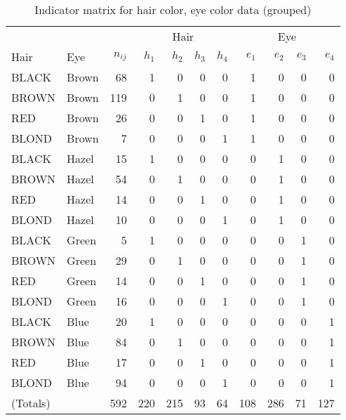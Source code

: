 \begin{table}[htb]
 \caption{Indicator matrix for hair color, eye color data (grouped)}\label{tab:haireye2}
 \begin{center}
 \begin{tabular}{|ll r | rrrr|rrrr|}
 \hline
       &     &     & \multicolumn{4}{c|}{Hair} & \multicolumn{4}{c|}{Eye} \\
  Hair & Eye & $n_{ij}$ 
  & $h_1$ & $h_2$ & $h_3$ & $h_4$ 
  & $e_1$ & $e_2$ & $e_3$ & $e_4$ 
  \\ 
 \hline
  BLACK & Brown &  68 & 1 & 0 & 0 & 0 & 1 & 0 & 0 & 0 \\ 
  BROWN & Brown & 119 & 0 & 1 & 0 & 0 & 1 & 0 & 0 & 0 \\ 
  RED   & Brown &  26 & 0 & 0 & 1 & 0 & 1 & 0 & 0 & 0 \\ 
  BLOND & Brown &   7 & 0 & 0 & 0 & 1 & 1 & 0 & 0 & 0 \\  [1mm]
  BLACK & Hazel &  15 & 1 & 0 & 0 & 0 & 0 & 1 & 0 & 0 \\ 
  BROWN & Hazel &  54 & 0 & 1 & 0 & 0 & 0 & 1 & 0 & 0 \\ 
  RED   & Hazel &  14 & 0 & 0 & 1 & 0 & 0 & 1 & 0 & 0 \\ 
  BLOND & Hazel &  10 & 0 & 0 & 0 & 1 & 0 & 1 & 0 & 0 \\  [1mm]
  BLACK & Green &   5 & 1 & 0 & 0 & 0 & 0 & 0 & 1 & 0 \\ 
  BROWN & Green &  29 & 0 & 1 & 0 & 0 & 0 & 0 & 1 & 0 \\ 
  RED   & Green &  14 & 0 & 0 & 1 & 0 & 0 & 0 & 1 & 0 \\ 
  BLOND & Green &  16 & 0 & 0 & 0 & 1 & 0 & 0 & 1 & 0 \\  [1mm]
  BLACK & Blue  &  20 & 1 & 0 & 0 & 0 & 0 & 0 & 0 & 1 \\ 
  BROWN & Blue  &  84 & 0 & 1 & 0 & 0 & 0 & 0 & 0 & 1 \\ 
  RED   & Blue  &  17 & 0 & 0 & 1 & 0 & 0 & 0 & 0 & 1 \\ 
  BLOND & Blue  &  94 & 0 & 0 & 0 & 1 & 0 & 0 & 0 & 1 \\ 
 \hline
 (Totals) &       & 592 
 & 220 & 215 & 93 & 64 
 & 108 & 286 & 71 & 127 
 \\ 
 \hline
 \end{tabular}
 \end{center}
\end{table}


